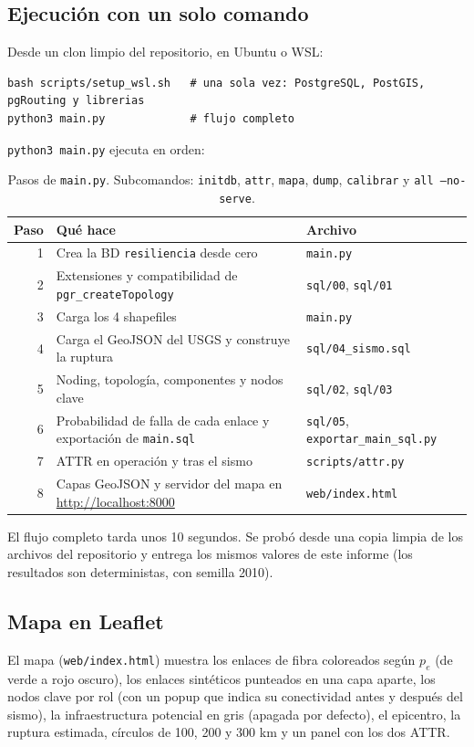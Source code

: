 \documentclass[11pt,a4paper]{article}
\newcommand{\cod}[1]{\texttt{#1}}
\begin{document}
\subsection{Ejecución con un solo comando}
Desde un clon limpio del repositorio, en Ubuntu o WSL:

\begin{Verbatim}
bash scripts/setup_wsl.sh   # una sola vez: PostgreSQL, PostGIS, pgRouting y librerias
python3 main.py             # flujo completo
\end{Verbatim}

\cod{python3 main.py} ejecuta en orden:

\begin{table}[h]
\centering
\small
\begin{tabularx}{\textwidth}{r X l}
\toprule
Paso & Qué hace & Archivo \\
\midrule
1 & Crea la BD \cod{resiliencia} desde cero & \cod{main.py} \\
2 & Extensiones y compatibilidad de \cod{pgr\_createTopology} & \cod{sql/00}, \cod{sql/01} \\
3 & Carga los 4 shapefiles & \cod{main.py} \\
4 & Carga el GeoJSON del USGS y construye la ruptura & \cod{sql/04\_sismo.sql} \\
5 & Noding, topología, componentes y nodos clave & \cod{sql/02}, \cod{sql/03} \\
6 & Probabilidad de falla de cada enlace y exportación de \cod{main.sql} & \cod{sql/05}, \cod{exportar\_main\_sql.py} \\
7 & ATTR en operación y tras el sismo & \cod{scripts/attr.py} \\
8 & Capas GeoJSON y servidor del mapa en \url{http://localhost:8000} & \cod{web/index.html} \\
\bottomrule
\end{tabularx}
\caption{Pasos de \cod{main.py}. Subcomandos: \cod{initdb}, \cod{attr}, \cod{mapa}, \cod{dump},
\cod{calibrar} y \cod{all --no-serve}.}
\end{table}

El flujo completo tarda unos 10 segundos. Se probó desde una copia limpia de los archivos del
repositorio y entrega los mismos valores de este informe (los resultados son deterministas, con
semilla 2010).

\subsection{Mapa en Leaflet}
El mapa (\cod{web/index.html}) muestra los enlaces de fibra coloreados según $p_e$ (de verde a rojo
oscuro), los enlaces sintéticos punteados en una capa aparte, los nodos clave por rol (con un popup que
indica su conectividad antes y después del sismo), la infraestructura potencial en gris (apagada por
defecto), el epicentro, la ruptura estimada, círculos de 100, 200 y 300 km y un panel con los dos ATTR.
\end{document}

